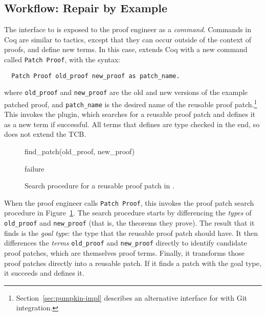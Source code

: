 \subsection{Workflow: Repair by Example}
\label{sec:pumpkin-workflow}

The interface to \sysname is exposed to the proof engineer as a \textit{command}. %
Commands in Coq are similar to tactics, except that they can occur outside of the context of proofs, and define new terms.
In this case, \sysname extends Coq with a new command called \lstinline{Patch Proof}, with the syntax:

\begin{lstlisting}
  Patch Proof old_proof new_proof as patch_name. 
\end{lstlisting}
where \lstinline{old_proof} and \lstinline{new_proof} are the old and new versions of the example patched proof,
and \lstinline{patch_name} is the desired name of the reusable proof patch.\footnote{Section~\ref{sec:pumpkin-impl} describes an alternative interface for \sysname with Git integration.}
This invokes the \sysname plugin, which searches for a reusable proof patch
and defines it as a new term if successful.
All terms that \sysname defines are type checked in the end, so \sysname does not extend the TCB. %

\begin{figure}
\begin{algorithmic}
\renewcommand{\thealgorithm}{}
\footnotesize
\caption{\footnotesize{find\_patch(old\_proof, new\_proof)}}
    \STATE {}
    \STATE {}
      \STATE {}
    \ENDIF
    \RETURN failure
\end{algorithmic}
\caption{Search procedure for a reusable proof patch in \sysname.}
\label{alg:patching}	
\end{figure}

When the proof engineer calls \lstinline{Patch Proof}, this invokes the proof patch search procedure in Figure~\ref{alg:patching}.
The search procedure starts by differencing the \textit{types} of \lstinline{old_proof} and \lstinline{new_proof}
(that is, the theorems they prove).
The result that it finds is the \textit{goal type}: the type that the reusable proof patch should have.
It then differences the \textit{terms} \lstinline{old_proof} and \lstinline{new_proof} directly to identify candidate proof patches,
which are themselves proof terms.
Finally, it transforms those proof patches directly into a reusable patch.
If it finds a patch with the goal type, it succeeds and defines it.

